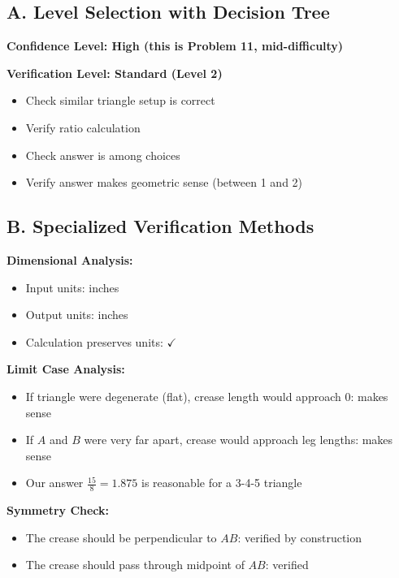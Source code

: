 \documentclass[12pt]{article}
\begin{document}
\begin{verificationbox}
\subsection*{A. Level Selection with Decision Tree}

\textbf{Confidence Level: High (this is Problem 11, mid-difficulty)}

\textbf{Verification Level: Standard (Level 2)}
\begin{itemize}
    \item Check similar triangle setup is correct
    \item Verify ratio calculation
    \item Check answer is among choices
    \item Verify answer makes geometric sense (between 1 and 2)
\end{itemize}

\subsection*{B. Specialized Verification Methods}

\textbf{Dimensional Analysis:}
\begin{itemize}
    \item Input units: inches
    \item Output units: inches
    \item Calculation preserves units: $\checkmark$
\end{itemize}

\textbf{Limit Case Analysis:}
\begin{itemize}
    \item If triangle were degenerate (flat), crease length would approach 0: makes sense
    \item If $A$ and $B$ were very far apart, crease would approach leg lengths: makes sense
    \item Our answer $\frac{15}{8} = 1.875$ is reasonable for a 3-4-5 triangle
\end{itemize}

\textbf{Symmetry Check:}
\begin{itemize}
    \item The crease should be perpendicular to $AB$: verified by construction
    \item The crease should pass through midpoint of $AB$: verified
\end{itemize}


\end{verificationbox}
\end{document}
